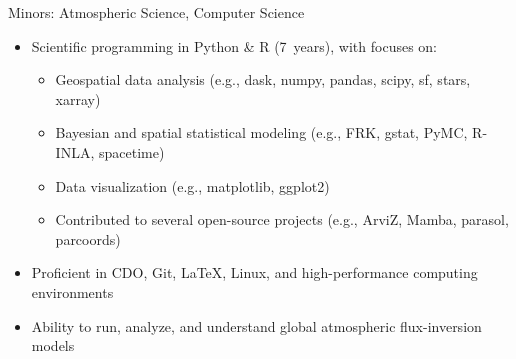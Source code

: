 \documentclass[10pt,letterpaper,ragged2e,withhyper]{altacv}
\begin{document}
\begin{paracol}{2}

  
  \vspace{-0.75em}
  \divider


  \vspace{-0.75em}
  \divider

  {\small Minors: Atmospheric Science, Computer Science}

  \medskip

  \begin{itemize}
    \item Scientific programming in Python \& R (7~years), with focuses on:
      \begin{itemize}
        \item Geospatial data analysis (e.g., dask, numpy, pandas, scipy, sf, stars, xarray)
        \item Bayesian and spatial statistical modeling (e.g., FRK, gstat, PyMC, R-INLA, spacetime)
        \item Data visualization (e.g., matplotlib, ggplot2)
        \item Contributed to several open-source projects (e.g., ArviZ, Mamba, parasol, parcoords)
      \end{itemize}
    \item Proficient in CDO, Git, LaTeX, Linux, and high-performance computing environments
    \item Ability to run, analyze, and understand global atmospheric flux-inversion models
  \end{itemize}


\end{paracol}
\end{document}
